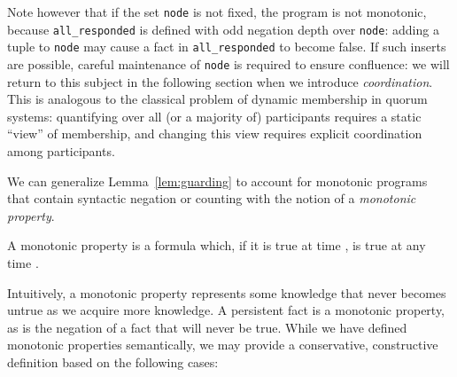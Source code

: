 Note however that if the set \texttt{node} is not fixed, the program is not monotonic, because 
\texttt{all\_responded} is defined with odd negation depth over \texttt{node}: adding a tuple
to \texttt{node} may cause a fact in \texttt{all\_responded} to become false.  If such inserts
are possible, careful maintenance of \texttt{node} is required to ensure confluence: we will
return to this subject in the following section when we introduce {\em coordination}.
This is analogous to the classical problem of dynamic membership in quorum systems: quantifying over all (or a majority
of) participants requires a static ``view'' of membership, and changing this view requires
explicit coordination among participants.



We can generalize Lemma~\ref{lem:guarding} to account for monotonic programs that 
contain syntactic negation or counting with
the notion of a {\em monotonic property}.




\begin{definition}
\label{def:mp}
A monotonic property is a formula which, if it is true at time ,  is true at any time .
\end{definition}

Intuitively, a monotonic property represents some knowledge that never becomes untrue as we acquire  more knowledge.  A persistent fact is a monotonic property, as is the negation of a
fact that will never be true.  
While we have defined monotonic properties semantically, we may provide a conservative, 
constructive definition based on the following cases:


